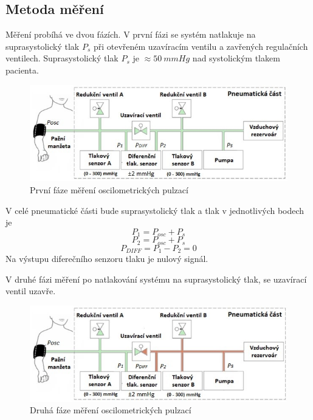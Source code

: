 \subsection{Metoda měření}
Měření probíhá ve dvou fázích. V první fázi se systém natlakuje na suprasystolický tlak $P_s$ při otevřeném uzavíracím ventilu a zavřených regulačních ventilech. Suprasystolický tlak $P_s$ je $\approx 50 \ mmHg$ nad systolickým tlakem pacienta.
\begin{figure}[H]
    \includegraphics[width=1\linewidth]{pictures/faze_mereni_1.jpg}
    \caption{První fáze měření oscilometrických pulzací}
\end{figure}
V celé pneumatické části bude suprasystolický tlak a tlak v jednotlivých bodech je
\begin{equation*}
    P_1 = P_{osc} + P_s
\end{equation*}
\begin{equation*}
    P_2 = P_{osc} + P_s
\end{equation*}
\begin{equation*}
    P_{DIFF} = P_1 - P_2 = 0
\end{equation*}
Na výstupu diferečního senzoru tlaku je nulový signál. \par
V druhé fázi měření po natlakování systému na suprasystolický tlak, se uzavírací ventil uzavře.
\begin{figure}[H]
    \includegraphics[width=1\linewidth]{pictures/faze_mereni_2.jpg}
    \caption{Druhá fáze měření oscilometrických pulzací}
\end{figure}
